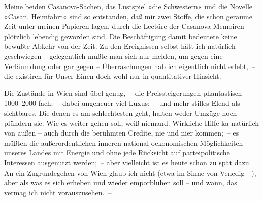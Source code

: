 \pstart
           {\pb}Meine beiden Casanova-Sachen, das Lustspiel »die
                  Schwestern« und die Novelle »Casan.
                  Heimfahrt« sind so entstanden, daß mir zwei Stoffe, die schon geraume Zeit
               unter meinen Papieren lagen, durch die Lectüre der Casanova Memoiren plötzlich lebendig geworden sind. Die
               Beschäftigung damit bedeutete keine bewußte Abkehr von der Zeit. Zu den Ereignissen
               selbst hätt ich natürlich geschwiegen – gelegentlich mußte man sich nur melden, um
               gegen eine Verläumdung oder gar gegen \label{K_L02376-3v}\label{K_L02376-3} – Überraschungen hab ich eigentlich
               nicht erlebt, – die existiren für Unser Einen doch wohl nur in quantitativer
               Hinsicht.\pend
           
\pstart
           Die Zustände in Wien sind übel genug, – die
               Preissteigerungen phantastisch 1000–2000 fach; – dabei ungeheuer viel Luxus; – und
               mehr stilles Elend als sichtbares. Die denen es am schlechtesten geht, halten weder
               Umzüge noch plündern sie. Wie es weiter gehen soll, weiß niemand. Wirkliche {\pb}Hilfe ka{\geminationn} natürlich
               von außen – auch durch die berühmten Credite, nie und ni{\geminationm}er kommen; – es müßten die außerordentlichen inneren \introOben{}national-\introOben{}oekonomischen Möglichkeiten unseres Landes mit Energie und ohne
               jede Rücksicht auf \introOben{}partei\introOben{}politische  Interessen ausgenutzt werden; – aber vielleicht ist
               es heute schon zu spät dazu. An ein Zugrundegehen von Wien glaub ich nicht (etwa im Sinne von Venedig –), aber als was es sich erheben und wieder emporblühen soll – und
               wann, das vermag ich nicht vorauszusehen. –\pend
           
